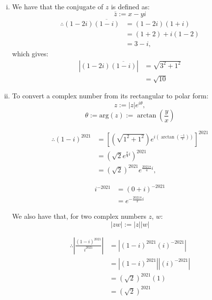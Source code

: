 \documentclass[a4paper, titlepage, DIV=14]{scrartcl}
\begin{document}
\begin{enumerate}
\begin{enumerate}[i)]
        \item We have that the conjugate of $z$ is defined as:
        \begin{equation}
            \bar{z} := x - yi \label{eq:z-bar}
        \end{equation}
        \begin{align*}
            \therefore (1-2i)\overline{(1-i)} &= (1-2i)(1+i) \\
                            &= (1+2) + i(1-2) \\
                            &= 3 - i,
        \end{align*} which gives:
        \begin{align*}
            |(1-2i)\overline{(1-i)}| &= \sqrt{3^{2}+1^{2}} \\
                    &= \sqrt{10}
        \end{align*}

        \item To convert a complex number from its rectangular to polar form:
        \begin{equation}
            z := |z|e^{i\theta},    \label{eq:z-polar}
        \end{equation}
        \begin{equation}
            \theta := \text{arg}(z) := \arctan(\frac{y}{x})    \label{eq:argz} 
        \end{equation}

        \begin{align*}
            \therefore (1-i)^{2021} 
                    &= [(\sqrt{1^{2}+1^{2}})e^{i(\arctan(\frac{-1}{1}))}]^{2021} \\
                    &= (\sqrt{2}e^{\frac{\pi}{4}i})^{2021} \\
                    &= (\sqrt{2})^{2021}e^{\frac{2021\pi}{4}i},
        \end{align*}

        \begin{align*}
            i^{-2021} &= (0 + i) ^{-2021} \\
                    &= e^{-\frac{2021\pi}{2}i}
        \end{align*}

        We also have that, for two complex numbers $z$, $w$:
        \begin{equation}
            |zw| := |z||w| \label{eq:zw-abs} 
        \end{equation}

        \begin{align*}
            \therefore |\frac{(1-i)^{2021}}{i^{2021}}| 
                    &= |(1-i)^{2021}(i)^{-2021}| \\
                    &= |(1-i)^{2021}||(i)^{-2021}| \\
                    &= (\sqrt{2})^{2021}(1) \\
                    &= (\sqrt{2})^{2021}
        \end{align*}


\end{enumerate}
\end{enumerate}
\end{document}
